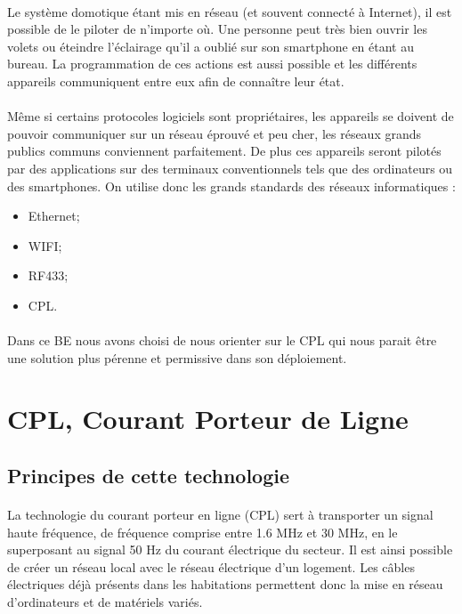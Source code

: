         \paragraph{}
Le système domotique étant mis en réseau (et souvent connecté à Internet), il est possible de le piloter de n’importe où.
Une personne peut très bien ouvrir les volets ou éteindre l'éclairage qu'il a oublié sur son smartphone en étant au bureau.
La programmation de ces actions est aussi possible et les différents appareils communiquent entre eux afin de connaître leur état.
        \paragraph{}
Même si certains protocoles logiciels sont propriétaires, les appareils se doivent de pouvoir communiquer sur un réseau éprouvé et peu cher,
les réseaux grands publics communs conviennent parfaitement.
De plus ces appareils seront pilotés par des applications sur des terminaux conventionnels tels que des ordinateurs ou des smartphones.
On utilise donc les grands standards des réseaux informatiques :
            \begin{itemize}
                \item Ethernet;
                \item WIFI;
                \item RF433;
                \item CPL.
            \end{itemize}
        \paragraph{}
Dans ce BE nous avons choisi de nous orienter sur le CPL qui nous parait être une solution plus pérenne et permissive dans son déploiement.

    \clearpage

    \section{CPL, Courant Porteur de Ligne}
        \subsection{Principes de cette technologie}
            \paragraph{}
La technologie du courant porteur en ligne (CPL) sert à transporter un signal haute fréquence,
de fréquence comprise entre 1.6 MHz et 30 MHz, en le superposant au signal 50 Hz du courant électrique du secteur.
Il est ainsi possible de créer un réseau local avec le réseau électrique d'un logement.
Les câbles électriques déjà présents dans les habitations permettent donc la mise en réseau d'ordinateurs et de matériels variés.

